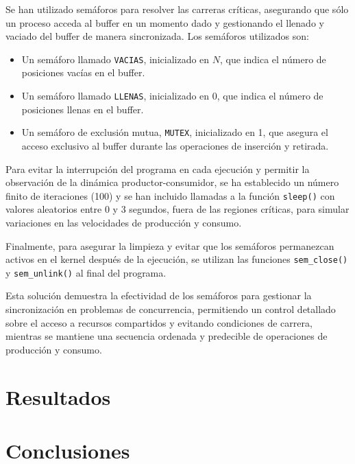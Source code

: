 \documentclass[twocolumn]{article}
\begin{document}
Se han utilizado semáforos para resolver las carreras críticas, asegurando que sólo un proceso acceda al buffer en un momento dado y gestionando el llenado y vaciado del buffer de manera sincronizada. Los semáforos utilizados son:

\begin{itemize}
    \item Un semáforo llamado \texttt{VACIAS}, inicializado en $N$, que indica el número de posiciones vacías en el buffer.
    \item Un semáforo llamado \texttt{LLENAS}, inicializado en 0, que indica el número de posiciones llenas en el buffer.
    \item Un semáforo de exclusión mutua, \texttt{MUTEX}, inicializado en 1, que asegura el acceso exclusivo al buffer durante las operaciones de inserción y retirada.
\end{itemize}

Para evitar la interrupción del programa en cada ejecución y permitir la observación de la dinámica productor-consumidor, se ha establecido un número finito de iteraciones (100) y se han incluido llamadas a la función \texttt{sleep()} con valores aleatorios entre 0 y 3 segundos, fuera de las regiones críticas, para simular variaciones en las velocidades de producción y consumo.

Finalmente, para asegurar la limpieza y evitar que los semáforos permanezcan activos en el kernel después de la ejecución, se utilizan las funciones \texttt{sem\_close()} y \texttt{sem\_unlink()} al final del programa.

Esta solución demuestra la efectividad de los semáforos para gestionar la sincronización en problemas de concurrencia, permitiendo un control detallado sobre el acceso a recursos compartidos y evitando condiciones de carrera, mientras se mantiene una secuencia ordenada y predecible de operaciones de producción y consumo.

\section{Resultados}
\lipsum[5-6] %

\section{Conclusiones}
\lipsum[7-8] %
\end{document}
